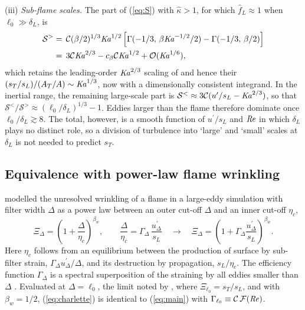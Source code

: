\documentclass[lineno]{jfm}
\providecommand{\Rey}{\mbox{\textit{Re}}}
\providecommand{\Ka}{\mbox{\textit{Ka}}}
\newcommand{\sL}{s_L}
\newcommand{\dL}{\delta_L}
\newcommand{\Cs}{\mathcal{C}}
\newcommand{\kh}{\hat{\kappa}}
\newcommand{\up}{u^{\prime}}
\begin{document}
(iii) \textit{Sub-flame scales.} The part of (\ref{eq:S}) with $\kh > 1$, for which $\hat f_L \approx 1$ when $\ell_0 \gg \dL$, is
\begin{align}
  \mathcal{S}^{>} & = \, \Cs(\beta / 2)^{1/3} \Ka^{1/2} \left[\Gamma(-1/3, \, \beta \Ka^{-1/2} / 2) - \Gamma(-1/3, \, \beta / 2)\right] \nonumber \\
  & = \, 3 \Cs \Ka^{2/3} - c_\beta \Cs \Ka^{1/2} + \mathcal{O}(\Ka^{1/6}),
  \label{eq:Sgt}
\end{align}
which retains the leading-order $\Ka^{2/3}$ scaling of \citet{Nivarti2019} and hence their $(s_T / \sL) / (A_T / A) \sim \Ka^{1/3}$, now with a dimensionally consistent integrand. In the inertial range, the remaining large-scale part is $\mathcal{S}^{<} \approx 3 \Cs(\up / \sL - \Ka^{2/3})$, so that $\mathcal{S}^{<} / \mathcal{S}^{>} \approx (\ell_0 / \dL)^{1/3} - 1$. Eddies larger than the flame therefore dominate once $\ell_0 / \dL \gtrsim 8$. The total, however, is a smooth function of $\up / \sL$ and $\Rey$ in which $\dL$ plays no distinct role, so a division of turbulence into `large' and `small' scales at $\dL$ is not needed to predict $s_T$.

\subsection{Equivalence with power-law flame wrinkling}\label{sec:wrinkling}

\citet{Charlette2002a} modelled the unresolved wrinkling of a flame in a large-eddy simulation with filter width $\Delta$ as a power law between an outer cut-off $\Delta$ and an inner cut-off $\eta_c$,
\begin{equation}
  \Xi_\Delta = \left(1 + \frac{\Delta}{\eta_c}\right)^{\beta_w}, \qquad \frac{\Delta}{\eta_c} = \Gamma_\Delta \, \frac{\up_\Delta}{\sL}
  \quad \longrightarrow \quad
  \Xi_\Delta = \left(1 + \Gamma_\Delta \frac{\up_\Delta}{\sL}\right)^{\beta_w}.
  \label{eq:charlette}
\end{equation}
Here $\eta_c$ follows from an equilibrium between the production of surface by sub-filter strain, $\Gamma_\Delta \up_\Delta / \Delta$, and its destruction by propagation, $\sL / \eta_c$. The efficiency function $\Gamma_\Delta$ is a spectral superposition of the straining by all eddies smaller than $\Delta$ \citep{MeneveauPoinsot1991,Colin2000}. Evaluated at $\Delta = \ell_0$, the limit noted by \citet{Charlette2002a}, where $\Xi_{\ell_0} = s_T / \sL$, and with $\beta_w = 1/2$, (\ref{eq:charlette}) is identical to (\ref{eq:main}) with $\Gamma_{\ell_0} \equiv \Cs \, \mathcal{F}(\Rey)$.
\end{document}
